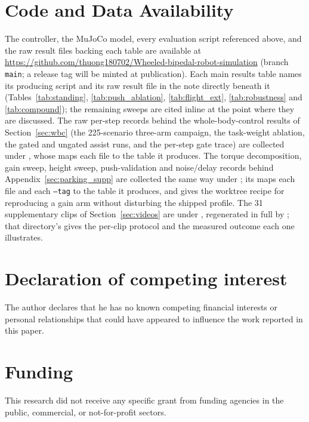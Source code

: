 \documentclass[a4paper,fleqn]{cas-dc}
\begin{document}
\section*{Code and Data Availability}
The controller, the MuJoCo model, every evaluation script referenced above, and the raw result files backing each table are available at \url{https://github.com/thuong180702/Wheeled-bipedal-robot-simulation} (branch \texttt{main}; a release tag will be minted at publication). Each main results table names its producing script and its raw result file in the note directly beneath it (Tables~\ref{tab:standing}, \ref{tab:push_ablation}, \ref{tab:flight_ext}, \ref{tab:robustness} and \ref{tab:compound}); the remaining sweeps are cited inline at the point where they are discussed. The raw per-step records behind the whole-body-control results of Section~\ref{sec:wbc} (the 225-scenario three-arm campaign, the task-weight ablation, the gated and ungated assist runs, and the per-step gate trace) are collected under , whose  maps each file to the table it produces. The torque decomposition, gain sweep, height sweep, push-validation and noise/delay records behind Appendix~\ref{sec:parking_supp} are collected the same way under ; its  maps each file and each \texttt{--tag} to the table it produces, and gives the worktree recipe for reproducing a gain arm without disturbing the shipped profile. The \num{31} supplementary clips of Section~\ref{sec:videos} are under , regenerated in full by ; that directory's  gives the per-clip protocol and the measured outcome each one illustrates.

\section*{Declaration of competing interest}
The author declares that he has no known competing financial interests or
personal relationships that could have appeared to influence the work reported
in this paper.

\section*{Funding}
This research did not receive any specific grant from funding agencies in the
public, commercial, or not-for-profit sectors.
\end{document}
